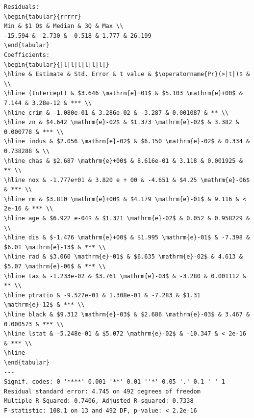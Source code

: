 \documentclass[10pt]{article}
\begin{document}
\begin{verbatim}
Residuals:
\begin{tabular}{rrrrr} 
Min & $1 Q$ & Median & 3Q & Max \\
-15.594 & -2.730 & -0.518 & 1.777 & 26.199
\end{tabular}
Coefficients:
\begin{tabular}{|l|l|l|l|l|l|}
\hline & Estimate & Std. Error & t value & $\operatorname{Pr}(>|t|)$ & \\
\hline (Intercept) & $3.646 \mathrm{e}+01$ & $5.103 \mathrm{e}+00$ & 7.144 & 3.28e-12 & *** \\
\hline crim & -1.080e-01 & 3.286e-02 & -3.287 & 0.001087 & ** \\
\hline zn & $4.642 \mathrm{e}-02$ & $1.373 \mathrm{e}-02$ & 3.382 & 0.000778 & *** \\
\hline indus & $2.056 \mathrm{e}-02$ & $6.150 \mathrm{e}-02$ & 0.334 & 0.738288 & \\
\hline chas & $2.687 \mathrm{e}+00$ & 8.616e-01 & 3.118 & 0.001925 & ** \\
\hline nox & -1.777e+01 & 3.820 e + 00 & -4.651 & $4.25 \mathrm{e}-06$ & *** \\
\hline rm & $3.810 \mathrm{e}+00$ & $4.179 \mathrm{e}-01$ & 9.116 & < 2e-16 & *** \\
\hline age & $6.922 e-04$ & $1.321 \mathrm{e}-02$ & 0.052 & 0.958229 & \\
\hline dis & $-1.476 \mathrm{e}+00$ & $1.995 \mathrm{e}-01$ & -7.398 & $6.01 \mathrm{e}-13$ & *** \\
\hline rad & $3.060 \mathrm{e}-01$ & $6.635 \mathrm{e}-02$ & 4.613 & $5.07 \mathrm{e}-06$ & *** \\
\hline tax & -1.233e-02 & $3.761 \mathrm{e}-03$ & -3.280 & 0.001112 & ** \\
\hline ptratio & -9.527e-01 & 1.308e-01 & -7.283 & $1.31 \mathrm{e}-12$ & *** \\
\hline black & $9.312 \mathrm{e}-03$ & $2.686 \mathrm{e}-03$ & 3.467 & 0.000573 & *** \\
\hline lstat & -5.248e-01 & $5.072 \mathrm{e}-02$ & -10.347 & < 2e-16 & *** \\
\hline
\end{tabular}
---
Signif. codes: 0 '****' 0.001 '**' 0.01 ''*' 0.05 '.' 0.1 ' ' 1
Residual standard error: 4.745 on 492 degrees of freedom
Multiple R-Squared: 0.7406, Adjusted R-squared: 0.7338
F-statistic: 108.1 on 13 and 492 DF, p-value: < 2.2e-16
\end{verbatim}
\end{document}
